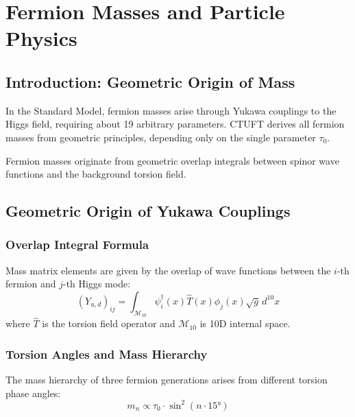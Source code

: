 \section{Fermion Masses and Particle Physics}
\label{sec:fermion_physics}

\subsection{Introduction: Geometric Origin of Mass}

In the Standard Model, fermion masses arise through Yukawa couplings to the Higgs field, requiring about 19 arbitrary parameters. CTUFT derives all fermion masses from geometric principles, depending only on the single parameter $\tau_0$.

\begin{insight}
Fermion masses originate from geometric overlap integrals between spinor wave functions and the background torsion field.
\end{insight}

\subsection{Geometric Origin of Yukawa Couplings}

\subsubsection{Overlap Integral Formula}

\begin{theorem}
Mass matrix elements are given by the overlap of wave functions between the $i$-th fermion and $j$-th Higgs mode:
\begin{equation}
    (Y_{u,d})_{ij} = \int_{\mathcal{M}_{10}} \psi_i^{\dagger}(x) \hat{T}(x) \phi_j(x) \sqrt{g} \, d^{10}x
\end{equation}
where $\hat{T}$ is the torsion field operator and $\mathcal{M}_{10}$ is 10D internal space.
\end{theorem}

\subsubsection{Torsion Angles and Mass Hierarchy}

The mass hierarchy of three fermion generations arises from different torsion phase angles:
\begin{equation}
    m_n \propto \tau_0 \cdot \sin^2(n \cdot 15°)
\end{equation}

